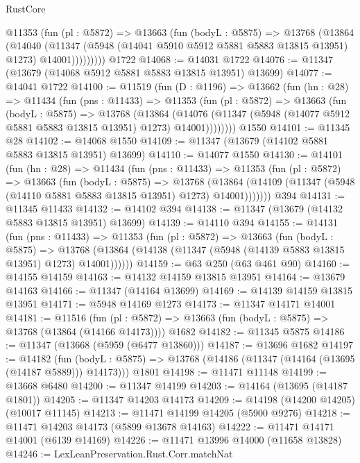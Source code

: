 \begin{lexlean}{RustCore}
\begin{coremodule}
          @11353
            (fun (pl : @5872) =>
            @13663
              (fun (bodyL : @5875) =>
              @13768
                (@13864
                  (@14040
                    (@11347
                      (@5948 (@14041 @5910 @5912 @5881 @5883 @13815 @13951) @1273)
                      @14001)))))))))
    @1722
@14068 := @14031 @1722
@14076 := @11347 (@13679 (@14068 @5912 @5881 @5883 @13815 @13951) @13699)
@14077 := @14041 @1722
@14100 := @11519
    (fun (D : @1196) =>
    @13662
      (fun (hn : @28) =>
      @11434
        (fun (pns : @11433) =>
        @11353
          (fun (pl : @5872) =>
          @13663
            (fun (bodyL : @5875) =>
            @13768
              (@13864
                (@14076
                  (@11347 (@5948 (@14077 @5912 @5881 @5883 @13815 @13951) @1273) @14001))))))))
    @1550
@14101 := @11345 @28
@14102 := @14068 @1550
@14109 := @11347 (@13679 (@14102 @5881 @5883 @13815 @13951) @13699)
@14110 := @14077 @1550
@14130 := @14101
    (fun (hn : @28) =>
    @11434
      (fun (pns : @11433) =>
      @11353
        (fun (pl : @5872) =>
        @13663
          (fun (bodyL : @5875) =>
          @13768
            (@13864 (@14109 (@11347 (@5948 (@14110 @5881 @5883 @13815 @13951) @1273) @14001)))))))
    @394
@14131 := @11345 @11433
@14132 := @14102 @394
@14138 := @11347 (@13679 (@14132 @5883 @13815 @13951) @13699)
@14139 := @14110 @394
@14155 := @14131
    (fun (pns : @11433) =>
    @11353
      (fun (pl : @5872) =>
      @13663
        (fun (bodyL : @5875) =>
        @13768 (@13864 (@14138 (@11347 (@5948 (@14139 @5883 @13815 @13951) @1273) @14001))))))
@14159 := @63 @250 (@63 @461 @90)
@14160 := @14155 @14159
@14163 := @14132 @14159 @13815 @13951
@14164 := @13679 @14163
@14166 := @11347 (@14164 @13699)
@14169 := @14139 @14159 @13815 @13951
@14171 := @5948 @14169 @1273
@14173 := @11347 @14171 @14001
@14181 := @11516
    (fun (pl : @5872) => @13663 (fun (bodyL : @5875) => @13768 (@13864 (@14166 @14173))))
    @1682
@14182 := @11345 @5875
@14186 := @11347 (@13668 (@5959 (@6477 @13860)))
@14187 := @13696 @1682
@14197 := @14182
    (fun (bodyL : @5875) => @13768 (@14186 (@11347 (@14164 (@13695 (@14187 @5889))) @14173)))
    @1801
@14198 := @11471 @11148
@14199 := @13668 @6480
@14200 := @11347 @14199
@14203 := @14164 (@13695 (@14187 @1801))
@14205 := @11347 @14203 @14173
@14209 := @14198 (@14200 @14205) (@10017 @11145)
@14213 := @11471 @14199 @14205 (@5900 @9276)
@14218 := @11471 @14203 @14173 (@5899 @13678 @14163)
@14222 := @11471 @14171 @14001 (@6139 @14169)
@14226 := @11471 @13996 @14000 (@11658 @13828)
@14246 := LexLeanPreservation.Rust.Corr.matchNat

\end{coremodule}
\end{lexlean}
